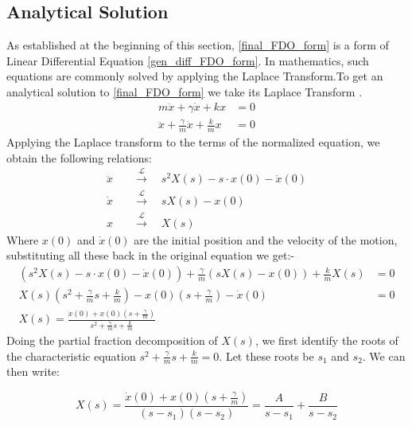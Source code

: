 \documentclass[10pt,twoside]{report}
\begin{document}
\subsection{Analytical Solution }
As established at the beginning of this section, \eqref{final_FDO_form} is a form of Linear Differential Equation \eqref{gen_diff_FDO_form}. In mathematics, such equations are commonly solved by applying the \gls{Laplace Transform}.To get an analytical solution to \eqref{final_FDO_form} we take its Laplace Transform .
\begin{align*}
    m\ddot{x} + \gamma \dot{x} + kx &= 0 \\
    \ddot{x} + \frac{\gamma}{m} \dot{x} + \frac{k}{m}x &= 0
\end{align*}
Applying the Laplace transform to the terms of the normalized equation, we obtain the following relations:
\begin{align}
    \ddot{x} &\quad \xrightarrow{\mathcal{L}} \quad s^2 X(s) - s \cdot x(0) - \dot{x}(0) \label{eq:laplace_ddx} \\[8pt]
    \dot{x}  &\quad \xrightarrow{\mathcal{L}} \quad s X(s) - x(0) \label{eq:laplace_dx} \\[8pt]
    x        &\quad \xrightarrow{\mathcal{L}} \quad X(s) \label{eq:laplace_x}
\end{align}
Where $x(0)$ and $\dot{x}(0)$ are the initial position and the velocity of the motion, substituting all these back in the original equation we get:-
\begin{align*}
\left( s^2 X(s) - s \cdot x(0) - \dot{x}(0) \right) + \frac{\gamma}{m} \left( s X(s) - x(0) \right) + \frac{k}{m} X(s) &= 0 \\[10pt]
X(s) \left( s^2 + \frac{\gamma}{m} s + \frac{k}{m} \right) - x(0) \left( s + \frac{\gamma}{m} \right) - \dot{x}(0) &= 0 \\[10pt]
X(s) = \frac{\dot{x}(0) + x(0) \left( s + \frac{\gamma}{m} \right)}{s^2 + \frac{\gamma}{m} s + \frac{k}{m}}&
\end{align*}
Doing the partial fraction decomposition of $X(s)$, we first identify the roots of the characteristic equation $s^2 + \frac{\gamma}{m}s + \frac{k}{m} = 0$. Let these roots be $s_1$ and $s_2$. We can then write:

\begin{equation*}
    X(s) = \frac{\dot{x}(0) + x(0) \left( s + \frac{\gamma}{m} \right)}{(s - s_1)(s -s_2)} = \frac{A}{s - s_1} + \frac{B}{s - s_2}
\end{equation*}
\end{document}
